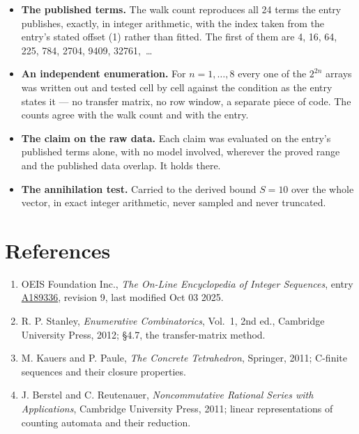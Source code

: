 \documentclass[11pt]{article}
\theoremstyle{definition}
\begin{document}
\begin{itemize}

\item {\bfseries The published terms.} The walk count reproduces all 24 terms the entry publishes, exactly, in integer arithmetic, with the index taken from the entry's stated offset (1) rather than fitted. The first of them are 4, 16, 64, 225, 784, 2704, 9409, 32761,~\dots

\item {\bfseries An independent enumeration.} For $n = 1,\dots,8$ every one of the $2^{2n}$ arrays was written out and tested cell by cell against the condition as the entry states it --- no transfer matrix, no row window, a separate piece of code. The counts agree with the walk count and with the entry.

\item {\bfseries The claim on the raw data.} Each claim was evaluated on the entry's published terms alone, with no model involved, wherever the proved range and the published data overlap. It holds there.

\item {\bfseries The annihilation test.} Carried to the derived bound $S = 10$ over the whole vector, in exact integer arithmetic, never sampled and never truncated.

\end{itemize}

\section{References}

\begin{enumerate}

\item OEIS Foundation Inc., \emph{The On-Line Encyclopedia of Integer Sequences}, entry \href{https://oeis.org/A189336}{A189336}, revision 9, last modified Oct 03 2025.

\item R. P. Stanley, \emph{Enumerative Combinatorics}, Vol.~1, 2nd ed., Cambridge University Press, 2012; \S4.7, the transfer-matrix method.

\item M. Kauers and P. Paule, \emph{The Concrete Tetrahedron}, Springer, 2011; C-finite sequences and their closure properties.

\item J. Berstel and C. Reutenauer, \emph{Noncommutative Rational Series with Applications}, Cambridge University Press, 2011; linear representations of counting automata and their reduction.

\end{enumerate}
\end{document}
